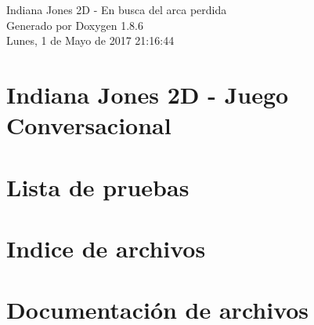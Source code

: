 \documentclass[twoside]{book}
\newcommand{\clearemptydoublepage}{%
  \newpage{\pagestyle{empty}\cleardoublepage}%
}
\begin{document}
\hypersetup{pageanchor=false}
\begin{titlepage}
\vspace*{7cm}
\begin{center}%
{\Large Indiana Jones 2\-D -\/ En busca del arca perdida }\\
\vspace*{1cm}
{\large Generado por Doxygen 1.8.6}\\
\vspace*{0.5cm}
{\small Lunes, 1 de Mayo de 2017 21:16:44}\\
\end{center}
\end{titlepage}
\clearemptydoublepage
\tableofcontents
\clearemptydoublepage
{}
\hypersetup{pageanchor=true}

\chapter{Indiana Jones 2\-D -\/ Juego Conversacional}
\label{index}\hypertarget{index}{}
\chapter{Lista de pruebas}
\label{test}
\hypertarget{test}{}

\chapter{Indice de archivos}

\chapter{Documentación de archivos}

























































\newpage
{}
{}
\printindex
\end{document}
